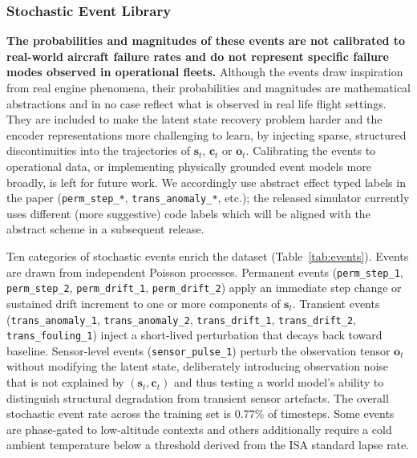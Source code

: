 \subsubsection{Stochastic Event Library}
\label{sec:dataset_events}

\noindent\textbf{The probabilities and magnitudes of these events are
not calibrated to real-world aircraft failure rates and do not represent
specific failure modes observed in operational fleets.} Although the
events draw inspiration from real engine phenomena, their probabilities
and magnitudes are mathematical abstractions and in no case reflect
what is observed in real life flight settings. They are included to
make the latent state recovery problem harder and the encoder
representations more challenging to learn, by injecting sparse,
structured discontinuities into the trajectories of $\mathbf{s}_t$,
$\mathbf{c}_t$ or $\mathbf{o}_t$. Calibrating the events to operational
data, or implementing physically grounded event models more broadly,
is left for future work. We accordingly use abstract effect typed
labels in the paper (\texttt{perm\_step\_*}, \texttt{trans\_anomaly\_*},
etc.); the released simulator currently uses different (more
suggestive) code labels which will be aligned with the abstract scheme
in a subsequent release.

Ten categories of stochastic events enrich the dataset
(Table~\ref{tab:events}). Events are drawn from independent Poisson
processes. Permanent events (\texttt{perm\_step\_1}, \texttt{perm\_step\_2},
\texttt{perm\_drift\_1}, \texttt{perm\_drift\_2}) apply an immediate
step change or sustained drift increment to one or more components of
$\mathbf{s}_t$. Transient events (\texttt{trans\_anomaly\_1},
\texttt{trans\_anomaly\_2}, \texttt{trans\_drift\_1},
\texttt{trans\_drift\_2}, \texttt{trans\_fouling\_1}) inject a
short-lived perturbation that decays back toward baseline.
Sensor-level events (\texttt{sensor\_pulse\_1}) perturb the observation
tensor $\mathbf{o}_t$ without modifying the latent state, deliberately
introducing observation noise that is not explained by $(\mathbf{s}_t,
\mathbf{c}_t)$ and thus testing a world model's ability to distinguish
structural degradation from transient sensor artefacts.
The overall stochastic event rate across the training set is $0.77\%$
of timesteps. Some events are phase-gated to low-altitude contexts and
others additionally require a cold ambient temperature below a
threshold derived from the ISA standard lapse rate.


